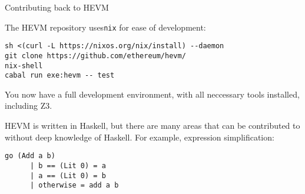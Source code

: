 \documentclass{beamer}
\begin{document}
\begin{frame}[fragile=singleslide]{Contributing back to HEVM}

The HEVM repository uses\texttt{nix} for ease of development:

\begin{Verbatim}[frame=single, framerule=0.2mm, framesep=2mm,fontsize=\footnotesize]
sh <(curl -L https://nixos.org/nix/install) --daemon
git clone https://github.com/ethereum/hevm/
nix-shell
cabal run exe:hevm -- test
\end{Verbatim}

You now have a full development environment, with all neccessary tools installed, including Z3.
\bigskip 

HEVM is written in Haskell, but there are many areas that can be contributed to without deep knowledge of Haskell. For example, expression simplification:

\begin{Verbatim}[frame=single, framerule=0.2mm, framesep=2mm,fontsize=\footnotesize]
    go (Add a b)
      | b == (Lit 0) = a
      | a == (Lit 0) = b
      | otherwise = add a b
\end{Verbatim}
\end{frame}
\end{document}
